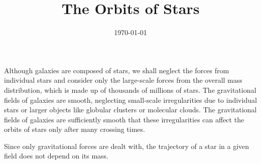 \documentclass[12pt,a4paper]{article}
\title{The Orbits of Stars}
\author{}
\date{\today}
\begin{document}
\maketitle

\cite{2008gady.book.....B} Although galaxies are composed of stars, we shall neglect the forces from individual stars and consider only the large-scale forces from the overall mass distribution, which is made up of thousands of millions of stars. The gravitational fields of galaxies are smooth, neglecting small-scale irregularities due to individual stars or larger objects like globular clusters or molecular clouds. The gravitational fields of galaxies are sufficiently smooth that these irregularities can affect the orbits of stars only after many crossing times.

Since only gravitational forces are dealt with, the trajectory of a star in a given field does not depend on its mass.
\end{document}
